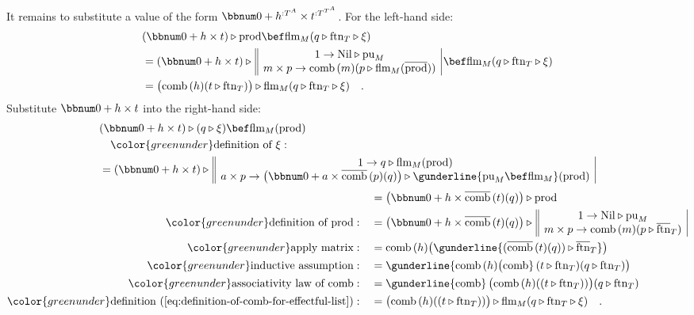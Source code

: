 It remains to substitute a value of the form $\bbnum 0+h^{:T^{A}}\times t^{:T^{T^{A}}}$.
For the left-hand side:
\begin{align*}
 & (\bbnum 0+h\times t)\triangleright\text{prod}\bef\text{flm}_{M}(q\triangleright\text{ftn}_{T}\triangleright\xi)\\
 & =(\bbnum 0+h\times t)\triangleright\,\begin{array}{||c|}
1\rightarrow\text{Nil}\triangleright\text{pu}_{M}\\
m\times p\rightarrow\text{comb}\,(m)(p\triangleright\text{flm}_{M}(\overline{\text{prod}}))
\end{array}\,\bef\text{flm}_{M}(q\triangleright\text{ftn}_{T}\triangleright\xi)\\
 & =\big(\text{comb}\,(h)(t\triangleright\text{ftn}_{T})\big)\triangleright\text{flm}_{M}(q\triangleright\text{ftn}_{T}\triangleright\xi)\quad.
\end{align*}
Substitute $\bbnum 0+h\times t$ into the right-hand side:
\begin{align*}
 & (\bbnum 0+h\times t)\triangleright(q\triangleright\xi)\bef\text{flm}_{M}(\text{prod})\\
 & \quad{\color{greenunder}\text{definition of }\xi:}\quad\\
 & =(\bbnum 0+h\times t)\triangleright\,\begin{array}{||c|}
1\rightarrow q\triangleright\text{flm}_{M}(\text{prod})\\
a\times p\rightarrow\big(\bbnum 0+a\times\overline{\text{comb}}\,(p)(q)\big)\triangleright\gunderline{\text{pu}_{M}\bef\text{flm}_{M}}(\text{prod})
\end{array}
\end{align*}
\begin{align*}
 & =\big(\bbnum 0+h\times\overline{\text{comb}}\,(t)(q)\big)\triangleright\text{prod}\\
{\color{greenunder}\text{definition of }\text{prod}:}\quad & =\big(\bbnum 0+h\times\overline{\text{comb}}\,(t)(q)\big)\triangleright\,\begin{array}{||c|}
1\rightarrow\text{Nil}\triangleright\text{pu}_{M}\\
m\times p\rightarrow\text{comb}\,(m)(p\triangleright\overline{\text{ftn}}_{T})
\end{array}\\
{\color{greenunder}\text{apply matrix}:}\quad & =\text{comb}\,(h)\big(\gunderline{(\overline{\text{comb}}\,(t)(q))\triangleright\overline{\text{ftn}}_{T}}\big)\\
{\color{greenunder}\text{inductive assumption}:}\quad & =\gunderline{\text{comb}\,(h)\big(\text{comb}}\,(t\triangleright\text{ftn}_{T})(q\triangleright\text{ftn}_{T})\big)\\
{\color{greenunder}\text{associativity law of }\text{comb}:}\quad & =\gunderline{\text{comb}}\,\big(\text{comb}\,(h)((t\triangleright\text{ftn}_{T}))\big)(q\triangleright\text{ftn}_{T})\\
{\color{greenunder}\text{definition~(\ref{eq:definition-of-comb-for-effectful-list})}:}\quad & =\big(\text{comb}\,(h)((t\triangleright\text{ftn}_{T}))\big)\triangleright\text{flm}_{M}(q\triangleright\text{ftn}_{T}\triangleright\xi)\quad.
\end{align*}
